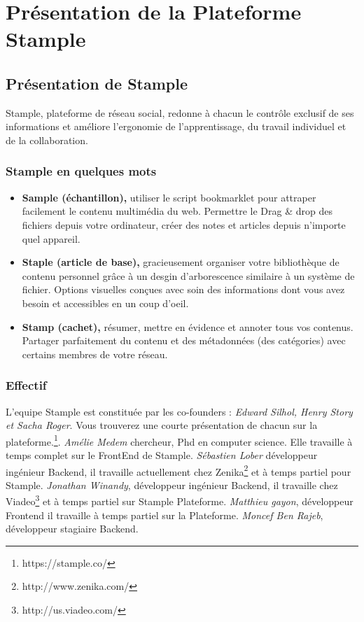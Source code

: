 \chapter{Présentation de la Plateforme Stample}
\section{Présentation de Stample}
Stample, plateforme de réseau social, redonne à chacun le contrôle exclusif de ses informations et améliore l'ergonomie de l'apprentissage, du travail individuel et de la collaboration.
\subsection{Stample en quelques mots}
\begin{itemize}
\item \textbf{Sample (échantillon),} utiliser le script bookmarklet pour attraper facilement le contenu multimédia du web. Permettre le Drag \& drop des fichiers depuis votre ordinateur, créer des notes et articles depuis n'importe quel appareil.
\item \textbf{Staple (article de base),} gracieusement organiser votre bibliothèque de contenu personnel grâce à un desgin d'arborescence similaire à un système de fichier.
Options visuelles conçues avec soin des informations dont vous avez besoin et accessibles en un coup d'oeil.
\item \textbf{Stamp (cachet),} résumer, mettre en évidence et annoter tous vos contenus.
Partager parfaitement du contenu et des métadonnées (des catégories) avec certains membres de votre réseau.
\end{itemize}
\subsection{Effectif}
L'equipe Stample est constituée par les co-founders :
\textit{Edward Silhol, Henry Story et Sacha Roger}. Vous trouverez une courte présentation de chacun sur la plateforme.\footnote{https://stample.co/}.\newline
\textit{Amélie Medem} chercheur, Phd en computer science. Elle travaille à temps complet sur le FrontEnd de Stample.\newline
\textit{Sébastien Lober} développeur ingénieur Backend, il travaille actuellement chez Zenika\footnote{http://www.zenika.com/} et à temps partiel pour Stample.\newline
\textit{Jonathan Winandy}, développeur ingénieur Backend, il travaille chez Viadeo\footnote{http://us.viadeo.com/} et à temps partiel sur Stample Plateforme.\newline
\textit{Matthieu gayon}, développeur Frontend il travaille à temps partiel sur la Plateforme.\newline
\textit{Moncef Ben Rajeb}, développeur stagiaire Backend.
